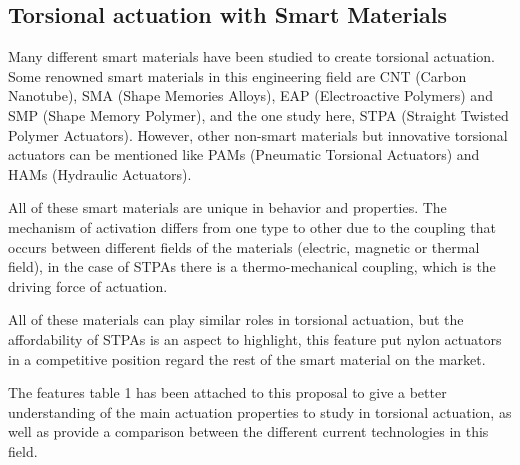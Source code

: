 \documentclass[12pt,oneside]{article}
\begin{document}
\subsection*{Torsional actuation with Smart Materials}
\hspace{0.4cm}Many different smart materials have been studied to create torsional actuation. Some renowned smart materials in this engineering field are CNT (Carbon Nanotube), SMA (Shape Memories Alloys), EAP (Electroactive Polymers) and SMP (Shape Memory Polymer), and the one study here, STPA (Straight Twisted Polymer Actuators). However, other non-smart materials but innovative torsional actuators can be mentioned like PAMs (Pneumatic Torsional Actuators) and HAMs (Hydraulic Actuators). \par
 All of these smart materials are unique in behavior and properties. The mechanism of activation differs from one type to other due to the coupling that occurs between different fields of the materials (electric, magnetic or thermal field), in the case of STPAs there is a thermo-mechanical coupling, which is the driving force of actuation. \par 
 All of these materials can play similar roles in torsional actuation, but the affordability of STPAs is an aspect to highlight, this feature put nylon actuators in a competitive position regard the rest of the smart material on the market. \par
 The features table 1 has been attached to this proposal to give a better understanding of the main actuation properties to study in torsional actuation, as well as provide a comparison between the different current technologies in this field.

\end{document}

